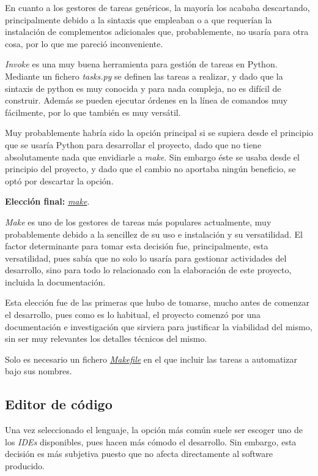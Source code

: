 En cuanto a los gestores de tareas genéricos, la mayoría los acababa descartando, principalmente debido a la sintaxis que empleaban o a que requerían la instalación de complementos adicionales que, probablemente, no usaría para otra cosa, por lo que me pareció inconveniente.

\textit{Invoke} es una muy buena herramienta para gestión de tareas en Python. Mediante un fichero \textit{tasks.py} se definen las tareas a realizar, y dado que la sintaxis de python es muy conocida y para nada compleja, no es difícil de construir. Además se pueden ejecutar órdenes en la línea de comandos muy fácilmente, por lo que también es muy versátil.

Muy probablemente habría sido la opción principal si se supiera desde el principio que se usaría Python para desarrollar el proyecto, dado que no tiene absolutamente nada que envidiarle a \textit{make}. Sin embargo éste se usaba desde el principio del proyecto, y dado que el cambio no aportaba ningún beneficio, se optó por descartar la opción.

\textbf{Elección final:} \href{https://www.gnu.org/software/make/}{\textit{make}}.

\textit{Make} es uno de los gestores de tareas más populares actualmente, muy probablemente debido a la sencillez de su uso e instalación y su versatilidad. El factor determinante para tomar esta decisión fue, principalmente, esta versatilidad, pues sabía que no solo lo usaría para gestionar actividades del desarrollo, sino para todo lo relacionado con la elaboración de este proyecto, incluida la documentación.

Esta elección fue de las primeras que hubo de tomarse, mucho antes de comenzar el desarrollo, pues como es lo habitual, el proyecto comenzó por una documentación e investigación que sirviera para justificar la viabilidad del mismo, sin ser muy relevantes los detalles técnicos del mismo.

Solo es necesario un fichero \href{https://github.com/Anglepi/My-Many-Reads/blob/main/Makefile}{\textit{Makefile}} en el que incluir las tareas a automatizar bajo sus nombres.

\subsection{Editor de código}
\label{Editor de código}

Una vez seleccionado el lenguaje, la opción más común suele ser escoger uno de los \textit{IDEs} disponibles, pues hacen más cómodo el desarrollo. Sin embargo, esta decisión es más subjetiva puesto que no afecta directamente al software producido.

